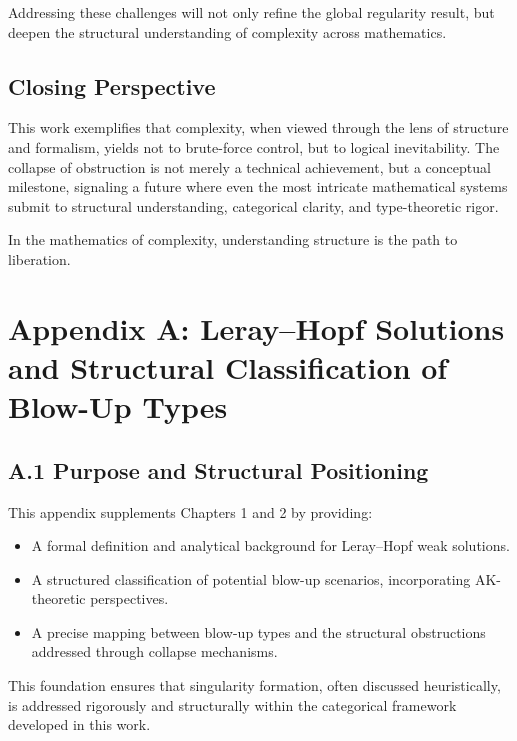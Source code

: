 \documentclass[11pt]{article}
\begin{document}
Addressing these challenges will not only refine the global regularity result, but deepen the structural understanding of complexity across mathematics.

\subsection{Closing Perspective}

This work exemplifies that complexity, when viewed through the lens of structure and formalism, yields not to brute-force control, but to logical inevitability. The collapse of obstruction is not merely a technical achievement, but a conceptual milestone, signaling a future where even the most intricate mathematical systems submit to structural understanding, categorical clarity, and type-theoretic rigor.

In the mathematics of complexity, understanding structure is the path to liberation.


\appendix

\section*{Appendix A: Leray–Hopf Solutions and Structural Classification of Blow-Up Types}

\subsection*{A.1 Purpose and Structural Positioning}

This appendix supplements Chapters 1 and 2 by providing:

\begin{itemize}
  \item A formal definition and analytical background for Leray–Hopf weak solutions.
  \item A structured classification of potential blow-up scenarios, incorporating AK-theoretic perspectives.
  \item A precise mapping between blow-up types and the structural obstructions addressed through collapse mechanisms.
\end{itemize}

This foundation ensures that singularity formation, often discussed heuristically, is addressed rigorously and structurally within the categorical framework developed in this work.
\end{document}
